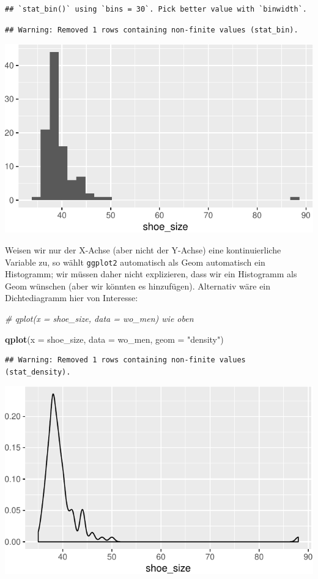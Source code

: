 \documentclass[12pt,ngerman,paper=a4,pagesize,DIV=13]{scrreprt}
\newenvironment{Shaded}{\begin{snugshade}}{\end{snugshade}}
\newcommand{\CommentTok}[1]{\textcolor[rgb]{0.56,0.35,0.01}{\textit{#1}}}
\newcommand{\DataTypeTok}[1]{\textcolor[rgb]{0.13,0.29,0.53}{#1}}
\newcommand{\KeywordTok}[1]{\textcolor[rgb]{0.13,0.29,0.53}{\textbf{#1}}}
\newcommand{\NormalTok}[1]{#1}
\newcommand{\StringTok}[1]{\textcolor[rgb]{0.31,0.60,0.02}{#1}}
\begin{document}
\begin{verbatim}
## `stat_bin()` using `bins = 30`. Pick better value with `binwidth`.
\end{verbatim}

\begin{verbatim}
## Warning: Removed 1 rows containing non-finite values (stat_bin).
\end{verbatim}

\includegraphics{DatenerhebungStatistik-Uebung_files/figure-latex/unnamed-chunk-239-1.pdf}

Weisen wir nur der X-Achse (aber nicht der Y-Achse) eine kontinuierliche
Variable zu, so wählt \texttt{ggplot2} automatisch als Geom automatisch
ein Histogramm; wir müssen daher nicht explizieren, dass wir ein
Histogramm als Geom wünschen (aber wir könnten es hinzufügen).
Alternativ wäre ein Dichtediagramm hier von Interesse:

\begin{Shaded}
\begin{Highlighting}[]
\CommentTok{# qplot(x = shoe_size, data = wo_men) wie oben}

\KeywordTok{qplot}\NormalTok{(}\DataTypeTok{x =}\NormalTok{ shoe_size, }\DataTypeTok{data =}\NormalTok{ wo_men, }\DataTypeTok{geom =} \StringTok{"density"}\NormalTok{)}
\end{Highlighting}
\end{Shaded}

\begin{verbatim}
## Warning: Removed 1 rows containing non-finite values (stat_density).
\end{verbatim}

\includegraphics{DatenerhebungStatistik-Uebung_files/figure-latex/unnamed-chunk-240-1.pdf}
\end{document}
